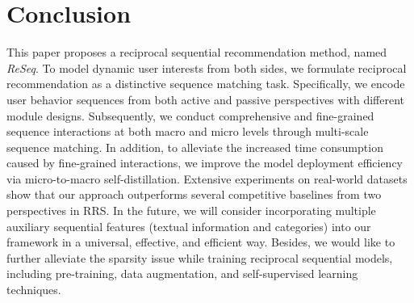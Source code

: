 \section{Conclusion}
This paper proposes a reciprocal sequential recommendation method, named \emph{ReSeq}. To model dynamic user interests from both sides, we formulate reciprocal recommendation as a distinctive sequence matching task.
Specifically, we encode user behavior sequences from both active and passive perspectives with different module designs.
Subsequently, we conduct comprehensive and fine-grained sequence interactions at both macro and micro levels through multi-scale sequence matching.
In addition, to alleviate the increased time consumption caused by fine-grained interactions, we improve the model deployment efficiency via micro-to-macro self-distillation.
Extensive experiments on real-world datasets show that our approach outperforms several competitive baselines from two perspectives in RRS.
In the future, 
we will consider incorporating multiple auxiliary sequential features (\eg textual information and categories) into our framework in a universal, effective, and efficient way. 
Besides, we would like to further alleviate the sparsity issue while training reciprocal sequential models, including pre-training, data augmentation, and self-supervised learning techniques.

\balance